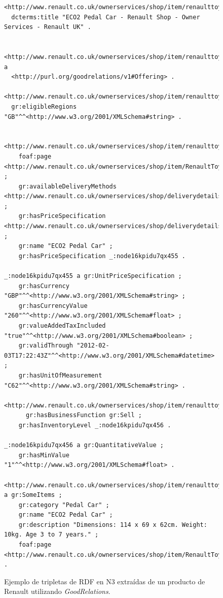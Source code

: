\begin{figure}[!htbp]
\centering
  \begin{lstlisting} 
<http://www.renault.co.uk/ownerservices/shop/item/renaulttoys/pedalcar/eco2pedalcar/default.aspx> 
  dcterms:title "ECO2 Pedal Car - Renault Shop - Owner Services - Renault UK" .


<http://www.renault.co.uk/ownerservices/shop/item/renaulttoys/pedalcar/eco2pedalcar/default.aspx#offering> a 
  <http://purl.org/goodrelations/v1#Offering> .

<http://www.renault.co.uk/ownerservices/shop/item/renaulttoys/pedalcar/eco2pedalcar/default.aspx#offering> 
  gr:eligibleRegions  "GB"^^<http://www.w3.org/2001/XMLSchema#string> .


<http://www.renault.co.uk/ownerservices/shop/item/renaulttoys/pedalcar/eco2pedalcar/default.aspx#offering> 
	foaf:page <http://www.renault.co.uk/ownerservices/shop/item/RenaultToys/PedalCar/ECO2PedalCar/default.aspx> ;
	gr:availableDeliveryMethods <http://www.renault.co.uk/ownerservices/shop/deliverydetails.aspx#delivery> ;
	gr:hasPriceSpecification <http://www.renault.co.uk/ownerservices/shop/deliverydetails.aspx#deliverycharges> ;
	gr:name "ECO2 Pedal Car" ;
	gr:hasPriceSpecification _:node16kpidu7qx455 .

_:node16kpidu7qx455 a gr:UnitPriceSpecification ;
	gr:hasCurrency "GBP"^^<http://www.w3.org/2001/XMLSchema#string> ;
	gr:hasCurrencyValue "260"^^<http://www.w3.org/2001/XMLSchema#float> ;
	gr:valueAddedTaxIncluded "true"^^<http://www.w3.org/2001/XMLSchema#boolean> ;
	gr:validThrough "2012-02-03T17:22:43Z"^^<http://www.w3.org/2001/XMLSchema#datetime> ;
	gr:hasUnitOfMeasurement "C62"^^<http://www.w3.org/2001/XMLSchema#string> .

<http://www.renault.co.uk/ownerservices/shop/item/renaulttoys/pedalcar/eco2pedalcar/default.aspx#offering> 
      gr:hasBusinessFunction gr:Sell ;
	gr:hasInventoryLevel _:node16kpidu7qx456 .

_:node16kpidu7qx456 a gr:QuantitativeValue ;
	gr:hasMinValue "1"^^<http://www.w3.org/2001/XMLSchema#float> .

<http://www.renault.co.uk/ownerservices/shop/item/renaulttoys/pedalcar/eco2pedalcar/default.aspx#product> a gr:SomeItems ;
	gr:category "Pedal Car" ;
	gr:name "ECO2 Pedal Car" ;
	gr:description "Dimensions: 114 x 69 x 62cm. Weight: 10kg. Age 3 to 7 years." ;	
	foaf:page <http://www.renault.co.uk/ownerservices/shop/item/RenaultToys/PedalCar/ECO2PedalCar/default.aspx> .
  \end{lstlisting}
\caption{Ejemplo de tripletas de RDF en N3 extraídas de un producto de Renault utilizando \textit{GoodRelations}.}
\label{fig:rdf-gr}
\end{figure}  

